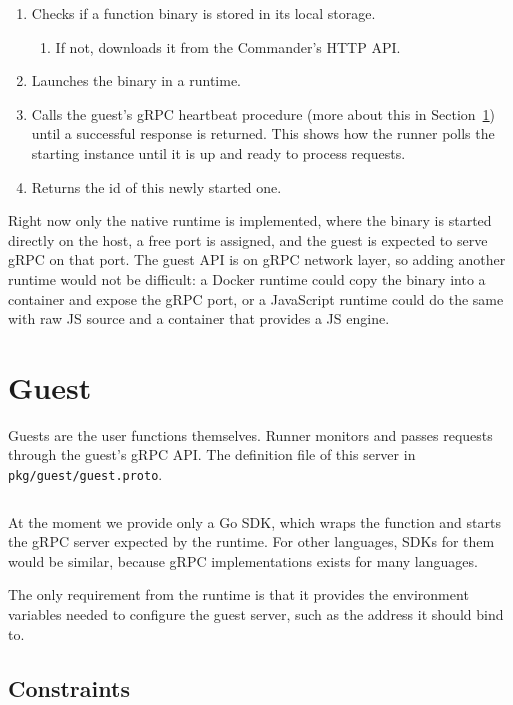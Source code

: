 \documentclass[11pt,a4paper]{article}
\begin{document}
\begin{enumerate}
	\item Checks if a function binary is stored in its local storage.
	      \begin{enumerate}
		      \item If not, downloads it from the Commander's HTTP API.
	      \end{enumerate}
	\item Launches the binary in a runtime.
	\item Calls the guest's gRPC heartbeat procedure (more about this in
	      Section~\ref{sec:guest}) until a successful response is returned.
	      This shows how the runner polls the starting instance until it is up
	      and ready to process requests.
	\item Returns the id of this newly started one.
\end{enumerate}

Right now only the native runtime is
implemented, where the binary is started directly on the host, a free port is
assigned, and the guest is expected to serve gRPC on that port. The
guest API is on gRPC network layer, so adding another runtime would not be
difficult: a Docker runtime could copy the binary into a container and expose
the gRPC port, or a JavaScript runtime could do the same with raw JS source
and a container that provides a JS engine.

\section{Guest}\label{sec:guest}

Guests are the user functions themselves. Runner monitors and passes requests
through the guest's gRPC API. The definition file of this server in \texttt{pkg/guest/guest.proto}.

\inputminted[fontsize=\scriptsize,breaklines,firstline=22,lastline=26]{proto}{../pkg/guest/guest.proto}

At the moment we provide only a Go
SDK, which wraps the function and starts the gRPC server expected by the
runtime. For other languages, SDKs for them would be similar, because gRPC implementations
exists for many languages.

The only requirement from the runtime is that it provides the environment
variables needed to configure the guest server, such as the address it should
bind to.

\subsection{Constraints}
\end{document}

